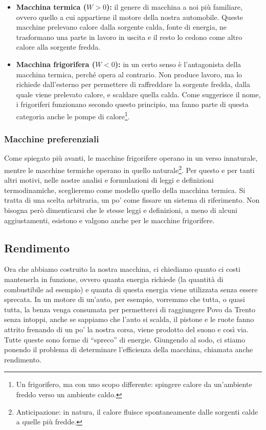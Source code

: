\begin{itemize}
    \item \textbf{Macchina termica ($W > 0$):} il genere di macchina a noi
    più familiare, ovvero quello a cui appartiene il motore della
    nostra automobile. Queste macchine prelevano calore dalla sorgente
    calda, fonte di energia, ne trasformano una parte in lavoro in uscita
    e il resto lo cedono come altro calore alla sorgente fredda.

    \item \textbf{Macchina frigorifera ($W < 0$):} in un certo senso
    è l'antagonista della macchina termica, perché opera al contrario.
    Non produce lavoro, ma lo richiede dall'esterno per permettere di
    raffreddare la sorgente fredda, dalla quale viene prelevato calore,
    e scaldare quella calda. Come suggerisce il nome, i frigoriferi
    funzionano secondo questo principio, ma fanno parte di questa
    categoria anche le
    pompe di calore\footnote{Un frigorifero, ma con uno
    scopo differente: spingere calore da un'ambiente freddo verso
    un ambiente caldo.}.
\end{itemize}

\subsubsection*{Macchine preferenziali}
Come spiegato più avanti, le macchine frigorifere
operano in un verso innaturale, mentre le macchine termiche operano in
quello naturale\footnote{Anticipazione: in natura, il calore
fluisce spontaneamente dalle sorgenti calde a quelle più fredde.}.
Per questo e per tanti altri motivi, nelle nostre analisi
e formulazioni di leggi e definizioni termodinamiche,
sceglieremo come modello quello della macchina termica.
Si tratta di una scelta arbitraria, un po' come fissare un
sistema di riferimento. Non bisogna però dimenticarsi che
le stesse leggi e definizioni, a meno di alcuni aggiustamenti,
esistono e valgono anche per le macchine frigorifere.

\subsection{Rendimento}
Ora che abbiamo costruito la nostra macchina, ci chiediamo quanto ci
costi mantenerla in funzione, ovvero quanta energia richiede (la quantità
di combustibile ad esempio) e quanta di questa energia viene utilizzata
senza essere sprecata. In un motore di un'auto, per esempio, vorremmo che
tutta, o quasi tutta, la benza venga consumata per permetterci di raggiungere
Povo da Trento senza intoppi, anche se sappiamo che l'auto si scalda, il pistone
e le ruote fanno attrito frenando di un po' la nostra corsa, viene prodotto
del suono e così via. Tutte queste sono forme di ``spreco'' di energie.
Giungendo al sodo, ci stiamo ponendo il problema
di determinare l'efficienza della macchina, chiamata anche rendimento.

